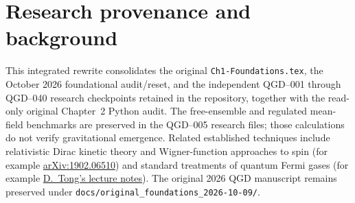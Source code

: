 \documentclass[11pt,a4paper]{article}
\begin{document}
\section*{Research provenance and background}
This integrated rewrite consolidates the original \texttt{Ch1-Foundations.tex}, the October 2026 foundational audit/reset, and the independent QGD--001 through QGD--040 research checkpoints retained in the repository, together with the read-only original Chapter~2 Python audit. The free-ensemble and regulated mean-field benchmarks are preserved in the QGD--005 research files; those calculations do not verify gravitational emergence. Related established techniques include relativistic Dirac kinetic theory and Wigner-function approaches to spin (for example \href{https://arxiv.org/abs/1902.06510}{arXiv:1902.06510}) and standard treatments of quantum Fermi gases (for example \href{https://www.damtp.cam.ac.uk/user/tong/statphys/statmechhtml/S3.html}{D.~Tong's lecture notes}). The original 2026 QGD manuscript remains preserved under \texttt{docs/original\_foundations\_2026-10-09/}.

\clearpage
\end{document}
